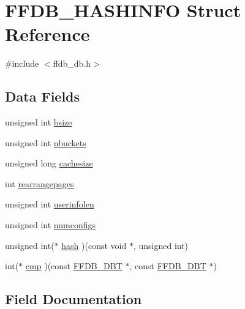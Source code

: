 \hypertarget{structFFDB__HASHINFO}{}\section{F\+F\+D\+B\+\_\+\+H\+A\+S\+H\+I\+N\+FO Struct Reference}
\label{structFFDB__HASHINFO}


{\ttfamily \#include $<$ffdb\+\_\+db.\+h$>$}

\subsection*{Data Fields}
\begin{DoxyCompactItemize}
\item 
unsigned int \mbox{\hyperlink{structFFDB__HASHINFO_ab87eb9b241c5c6028a766ef419fb7a9f}{bsize}}
\item 
unsigned int \mbox{\hyperlink{structFFDB__HASHINFO_aa4a10df8b4ccdd1ac58b4655a943db0d}{nbuckets}}
\item 
unsigned long \mbox{\hyperlink{structFFDB__HASHINFO_aa04759ec519e79ce156d42660acafb7f}{cachesize}}
\item 
int \mbox{\hyperlink{structFFDB__HASHINFO_a2399ac211531c76b33d9e34ed60a86c9}{rearrangepages}}
\item 
unsigned int \mbox{\hyperlink{structFFDB__HASHINFO_ab4185e8dc1347babf4e17733755073de}{userinfolen}}
\item 
unsigned int \mbox{\hyperlink{structFFDB__HASHINFO_a6f03a772f4e63a8b7bed61705406f9b7}{numconfigs}}
\item 
unsigned int($\ast$ \mbox{\hyperlink{structFFDB__HASHINFO_af4b51f3d6131122f6f375d688d6752aa}{hash}} )(const void $\ast$, unsigned int)
\item 
int($\ast$ \mbox{\hyperlink{structFFDB__HASHINFO_a2c214c2327e467cdb235487f023ddc78}{cmp}} )(const \mbox{\hyperlink{other__libs_2filedb_2filehash_2ffdb__db_8h_aa2e0984399491df0fdd20898ca8758f9}{F\+F\+D\+B\+\_\+\+D\+BT}} $\ast$, const \mbox{\hyperlink{other__libs_2filedb_2filehash_2ffdb__db_8h_aa2e0984399491df0fdd20898ca8758f9}{F\+F\+D\+B\+\_\+\+D\+BT}} $\ast$)
\end{DoxyCompactItemize}


\subsection{Field Documentation}
\mbox{\label{structFFDB__HASHINFO_ab87eb9b241c5c6028a766ef419fb7a9f}} 
